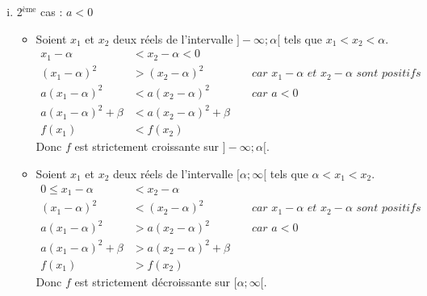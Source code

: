 \documentclass[10pt]{article} %
\begin{document}
{\begin{enumerate}[(i)]
        \item 2$^{\text{ème}}$ cas : $a<0$
              \begin{itemize}
                  \item Soient $x_1$ et $x_2$ deux réels de l'intervalle $]-\infty;\alpha[$ tels que $x_1<x_2<\alpha$.
                                    \begin{align*}
                                        x_1-\alpha            & <  x_2-\alpha < 0       &  &                                                          \\
                                        (x_1-\alpha)^2        & >  (x_2-\alpha)^2       &  & \textit{ car $x_1-\alpha$ et $x_2-\alpha$ sont positifs} \\
                                        a(x_1-\alpha)^2       & < a(x_2-\alpha)^2       &  & \textit{ car } a<0                                       \\
                                        a(x_1-\alpha)^2+\beta & < a(x_2-\alpha)^2+\beta &  &                                                          \\
                                        f(x_1)                & < f(x_2)                &  &
                                    \end{align*}
                                    Donc $f$ est strictement croissante sur $]-\infty;\alpha[$.
                  \item Soient $x_1$ et $x_2$ deux réels de l'intervalle $[\alpha;\infty[$ tels que $\alpha<x_1<x_2$.
                        \begin{align*}
                            0\leq x_1-\alpha      & <  x_2-\alpha           &  &                                                          \\
                            (x_1-\alpha)^2        & <  (x_2-\alpha)^2       &  & \textit{ car $x_1-\alpha$ et $x_2-\alpha$ sont positifs} \\
                            a(x_1-\alpha)^2       & > a(x_2-\alpha)^2       &  & \textit{ car } a<0                                       \\
                            a(x_1-\alpha)^2+\beta & > a(x_2-\alpha)^2+\beta &  &                                                          \\
                            f(x_1)                & > f(x_2)                &  &
                        \end{align*}
                        Donc $f$ est strictement décroissante sur $[\alpha;\infty[$.
              \end{itemize}
    \end{enumerate}
}
\end{document}
